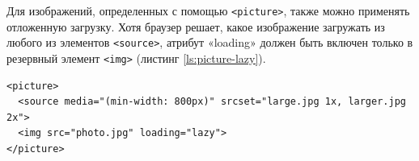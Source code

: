 Для изображений, определенных с помощью \verb|<picture>|, также можно применять отложенную загрузку. Хотя браузер решает, какое изображение загружать из любого из элементов \verb|<source>|, атрибут «loading» должен быть включен только в резервный элемент \verb|<img>| (листинг \ref{ls:picture-lazy}).

\begin{lstlisting}[caption={Использование атрибута loading для отложенной загрузки изображений в элементе <picture>}, label={ls:picture-lazy}]
<picture>
  <source media="(min-width: 800px)" srcset="large.jpg 1x, larger.jpg 2x">
  <img src="photo.jpg" loading="lazy">
</picture>
\end{lstlisting}
